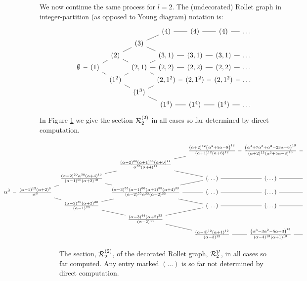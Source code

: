 We now continue the same process for $l=2$.
The (undecorated) Rollet graph in integer-partition (as opposed to Young diagram) notation is:
\[
\begin{tikzcd}[column sep=0.6em,row sep=0em]
&&&&(4)\ar[dash,r]&(4)\ar[dash,r]&(4)\ar[dash,r]&\dots\\
&&&(3)\ar[dash,ur]\ar[dash,dr]\\
&&(2)\arrow[dash,ur]\arrow[dash,dr]&& (3,1)\ar[dash,r]&(3,1)\ar[dash,r]&(3,1)\ar[dash,r]&\dots\\
\emptyset\arrow[dash,r] & (1)\arrow[dash,ur]\arrow[dash,dr] &&(2,1)\ar[dash,ur]\ar[dash,dr]\ar[dash,r]&(2,2)\ar[dash,r]&(2,2)\ar[dash,r]&(2,2)\ar[dash,r]&\dots\\
&&(1^2)\arrow[dash,ur]\arrow[dash,dr]&&(2,1^2)\ar[dash,r]&(2,1^2)\ar[dash,r]&(2,1^2)\ar[dash,r]&\dots\\
&&&(1^3)\ar[dash,dr]\ar[dash,ur]\\
&&&&(1^4)\ar[dash,r]&(1^4)\ar[dash,r]&(1^4)\ar[dash,r]&\dots
\end{tikzcd}
\]
In Figure \ref{fig:l2} we give the section ${\mathcal{R}}_2^{(2)}$ in all cases so far determined by direct computation. 
\begin{figure}
\[
\hspace{-3.51cm} \begin{tikzcd}[column sep=0.6em,row sep=0em]
&&&&\frac{(\alpha +2)^{12} \left(\alpha ^2+5 \alpha -8\right)^{12}}{(\alpha +1)^{12} (\alpha +6)^{12}}\ar[dash,r]&\frac{\left(\alpha ^4+7 \alpha ^3+\alpha ^2-23 \alpha -6\right)^{13}}{(\alpha +2)^{13} \left(\alpha ^2+5 \alpha -8\right)^{13}}\ar[dash,r]&{}\\
&&&\frac{(\alpha -2)^{33} (\alpha +1)^{44} (\alpha +6)^{11}}{\alpha ^{33} (\alpha +4)^{11}}\ar[dash,ur]\ar[dash,dr]\\
&&\frac{(\alpha -2)^{20} \alpha ^{30} (\alpha +4)^{10}}{(\alpha -1)^{20} (\alpha +2)^{10}}\arrow[dash,ur]\arrow[dash,dr]&& (\dots)\ar[dash,r]&(\dots)\ar[dash,r]&{}\\
\alpha ^3 \arrow[dash,r] & \frac{(\alpha -1)^{12} (\alpha +2)^6}{\alpha ^6} \arrow[dash,ur]\arrow[dash,dr] &&\frac{ (\alpha -3)^{55} (\alpha -1)^{66} (\alpha +1)^{55} (\alpha +4)^{33}}{ (\alpha -2)^{55} \alpha ^{33} (\alpha +2)^{33}}\ar[dash,ur]\ar[dash,dr]\ar[dash,r]&(\dots)\ar[dash,r]&(\dots)\ar[dash,r]&{}\\
&&\frac{(\alpha -2)^{30} (\alpha +2)^{20}}{(\alpha -1)^{20}}\arrow[dash,ur]\arrow[dash,dr]&&(\dots)\ar[dash,r]&(\dots)\ar[dash,r]&{}\\
&&&\frac{(\alpha -3)^{44} (\alpha +2)^{33}}{(\alpha -2)^{33}}\ar[dash,dr]\ar[dash,ur]\\
&&&&\frac{(\alpha -4)^{12} (\alpha +1)^{12}}{(\alpha -3)^{12}}\ar[dash,r]&\frac{\left(\alpha ^3-3 \alpha ^2-5 \alpha +3\right)^{13}}{(\alpha -4)^{13} (\alpha +1)^{13}}\ar[dash,r]&{}
\end{tikzcd}
\]
\caption{The section, ${\mathcal{R}}_2^{(2)}$, of the decorated Rollet graph, ${\mathcal{R}}^{{\mathcal V}}_2$, in all cases so far computed. Any entry marked $(\dots)$ is so far not determined by direct computation.
\label{fig:l2}}
\end{figure}
 
